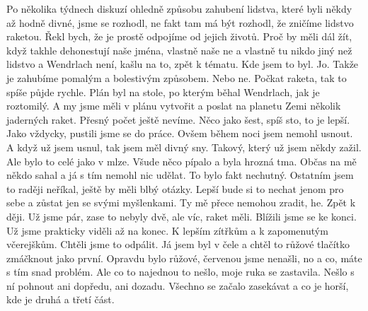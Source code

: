 Po několika týdnech diskuzí ohledně způsobu zahubení lidstva, které byli někdy až hodně divné, jsme se rozhodl, ne fakt tam má být rozhodl, že zničíme lidstvo raketou. Řekl bych, že je prostě odpojíme od jejich životů. Proč by měli dál žít, když takhle dehonestují naše jména, vlastně naše ne a vlastně tu nikdo jiný než lidstvo a Wendrlach není, kašlu na to, zpět k tématu. Kde jsem to byl. Jo. Takže je zahubíme pomalým a bolestivým způsobem. Nebo ne. Počkat raketa, tak to spíše půjde rychle. Plán byl na stole, po kterým běhal Wendrlach, jak je roztomilý. A my jsme měli v plánu vytvořit a poslat na planetu Zemi několik jaderných raket. Přesný počet ještě nevíme. Něco jako šest, spíš sto, to je lepší. Jako vždycky, pustili jsme se do práce. Ovšem během noci jsem nemohl usnout. A když už jsem usnul, tak jsem měl divný sny. Takový, který už jsem někdy zažil. Ale bylo to celé jako v mlze. Všude něco pípalo a byla hrozná tma. Občas na mě někdo sahal a já s tím nemohl nic udělat. To bylo fakt nechutný. Ostatním jsem to raději neříkal, ještě by měli blbý otázky. Lepší bude si to nechat jenom pro sebe a zůstat jen se svými myšlenkami. Ty mě přece nemohou zradit, he. Zpět k ději. Už jsme pár, zase to nebyly dvě, ale víc, raket měli. Blížili jsme se ke konci. Už jsme prakticky viděli až na konec. K lepším zítřkům a k zapomenutým včerejškům. Chtěli jsme to odpálit. Já jsem byl v čele a chtěl to růžové tlačítko zmáčknout jako první. Opravdu bylo růžové, červenou jsme nenašli, no a co, máte s tím snad problém. Ale co to najednou to nešlo, moje ruka se zastavila. Nešlo s ní pohnout ani dopředu, ani dozadu. Všechno se začalo zasekávat a co je horší, kde je druhá a třetí část.
